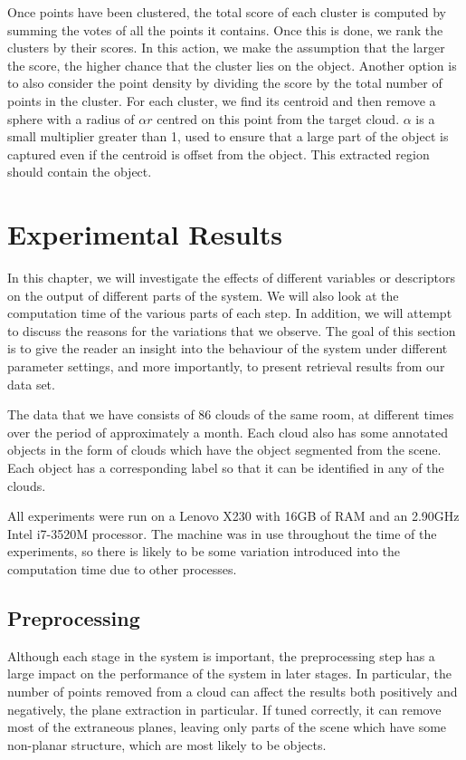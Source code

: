 \documentclass[11pt,a4paper]{kth-mag}
\begin{document}
Once points have been clustered, the total score of each cluster is computed by
summing the votes of all the points it contains. Once this is done, we rank the
clusters by their scores. In this action, we make the assumption that the larger
the score, the higher chance that the cluster lies on the object. Another option
is to also consider the point density by dividing the score by the total number
of points in the cluster. For each cluster, we find its centroid and then remove
a sphere with a radius of $\alpha r$ centred on this point from the target
cloud. $\alpha$ is a small multiplier greater than 1, used to ensure that a
large part of the object is captured even if the centroid is offset from the
object. This extracted region should contain the object.



\chapter{Experimental Results}
\label{chap:exp}
In this chapter, we will investigate the effects of different variables or
descriptors on the output of different parts of the system. We will also look at
the computation time of the various parts of each step. In addition, we will
attempt to discuss the reasons for the variations that we observe. The goal of
this section is to give the reader an insight into the behaviour of the system
under different parameter settings, and more importantly, to present retrieval
results from our data set.

The data that we have consists of 86 clouds of the same room, at different times
over the period of approximately a month. Each cloud also has some annotated
objects in the form of clouds which have the object segmented from the scene.
Each object has a corresponding label so that it can be identified in any of the
clouds.

All experiments were run on a Lenovo X230 with 16GB of RAM and an 2.90GHz Intel
i7-3520M processor. The machine was in use throughout the time of the
experiments, so there is likely to be some variation introduced into the
computation time due to other processes.

\section{Preprocessing}
Although each stage in the system is important, the preprocessing step has a
large impact on the performance of the system in later stages. In particular,
the number of points removed from a cloud can affect the results both positively
and negatively, the plane extraction in particular. If tuned correctly, it can
remove most of the extraneous planes, leaving only parts of the scene which have
some non-planar structure, which are most likely to be objects. 
\end{document}
